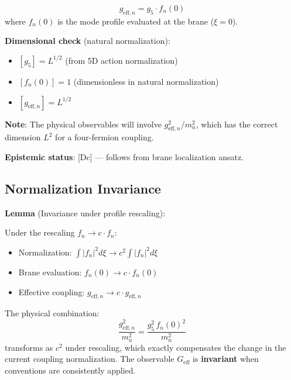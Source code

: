\begin{tcolorbox}[colback=orange!5!white, colframe=orange!50!black,
    title=\textbf{Key Result: Effective 4D Coupling (Brane-Localized)}]
\begin{equation}
    \boxed{g_{\text{eff},n} = g_5 \cdot f_n(0)}
    \label{eq:ch19_geff_n}
\end{equation}
where $f_n(0)$ is the mode profile evaluated at the brane ($\xi = 0$).

\textbf{Dimensional check} (natural normalization):
\begin{itemize}
    \item $[g_5] = L^{1/2}$ (from 5D action normalization)
    \item $[f_n(0)] = 1$ (dimensionless in natural normalization)
    \item $[g_{\text{eff},n}] = L^{1/2}$
\end{itemize}

\textbf{Note}: The physical observables will involve $g_{\text{eff},n}^2 / m_n^2$, which
has the correct dimension $L^2$ for a four-fermion coupling.

\textbf{Epistemic status}: [Dc] --- follows from brane localization ansatz.

\end{tcolorbox}

\subsection{Normalization Invariance}

\textbf{Lemma} (Invariance under profile rescaling):

Under the rescaling $f_n \to c \cdot f_n$:
\begin{itemize}
    \item Normalization: $\int |f_n|^2 d\xi \to c^2 \int |f_n|^2 d\xi$
    \item Brane evaluation: $f_n(0) \to c \cdot f_n(0)$
    \item Effective coupling: $g_{\text{eff},n} \to c \cdot g_{\text{eff},n}$
\end{itemize}

The physical combination:
\begin{equation}
    \frac{g_{\text{eff},n}^2}{m_n^2} = \frac{g_5^2 \, f_n(0)^2}{m_n^2}
\end{equation}
transforms as $c^2$ under rescaling, which exactly compensates the change in the
current coupling normalization. The observable $G_{\text{eff}}$ is \textbf{invariant}
when conventions are consistently applied.

